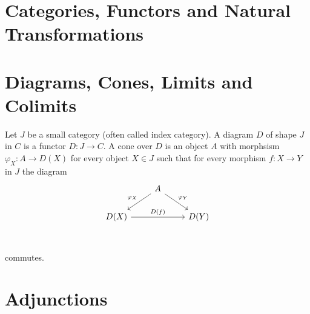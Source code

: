 \section{Categories, Functors and Natural Transformations}

\section{Diagrams, Cones, Limits and Colimits}
  Let $J$ be a small category (often called index category). A diagram $D$ of shape $J$ in $C$ is a functor $D: J \to C$. A cone over $D$ is an object $A$ with morphsism $\varphi_X: A \to D(X)$ for every object $X \in J$ such that for every morphism $f: X \to Y$ in $J$ the diagram 
\[\begin{tikzcd}
	& A \\
	{D(X)} && {D(Y)} \\
	& {}
	\arrow["{\varphi_X}"', from=1-2, to=2-1]
	\arrow["{\varphi_Y}", from=1-2, to=2-3]
	\arrow["{D(f)}", from=2-1, to=2-3]
\end{tikzcd}\]
  commutes.

\section{Adjunctions}